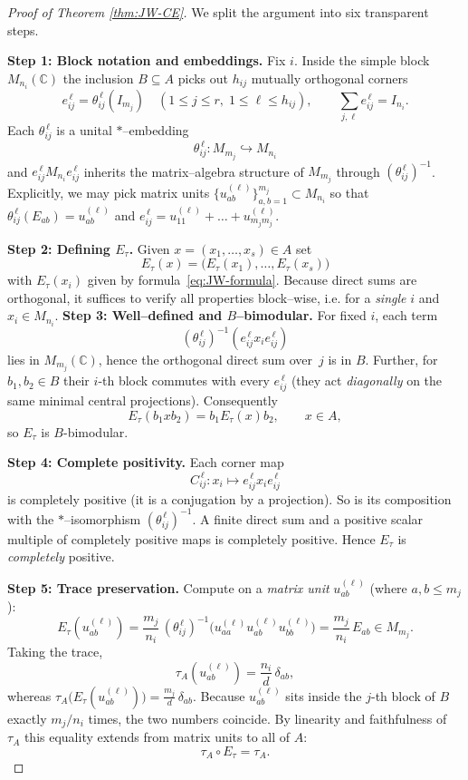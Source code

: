 \documentclass[11pt]{article}
\theoremstyle{mytheoremstyle}
\theoremstyle{definition}
\theoremstyle{remark}
\begin{document}
\begin{proof}[Proof of Theorem \ref{thm:JW-CE}]
We split the argument into six transparent steps.

\medskip
\noindent\textbf{Step 1: Block notation and embeddings.} Fix $i$.
Inside the simple block $M_{n_i}(\mathbb{C})$ the inclusion
$B\subseteq A$ picks out
$h_{ij}$ mutually orthogonal corners
\[
   e_{ij}^{\,\ell}= \theta_{ij}^{\,\ell}(I_{m_j}) 
   \quad
   (1\le j\le r,\;1\le \ell\le h_{ij}),
   \qquad
   \sum_{j,\ell}e_{ij}^{\,\ell}=I_{n_i}.
\]
Each $\theta_{ij}^{\,\ell}$ is a unital $\ast$–embedding
\[
\theta_{ij}^{\,\ell}:M_{m_j}\hookrightarrow M_{n_i}
\]
and \(e_{ij}^{\,\ell}M_{n_i}e_{ij}^{\,\ell}\)
inherits the matrix–algebra structure of $M_{m_j}$ through
\((\theta_{ij}^{\,\ell})^{-1}\). 
Explicitly, we may pick matrix units \(\{u^{(\ell)}_{ab}\}_{a,b=1}^{m_j}\subset M_{n_i}\)
so that
$\theta_{ij}^{\,\ell}(E_{ab})=u_{ab}^{(\ell)}$
and
$e_{ij}^{\,\ell}=u^{(\ell)}_{11}+\dots+u^{(\ell)}_{m_jm_j}$.

\medskip
\noindent\textbf{Step 2: Defining $E_\tau$.} Given $x=(x_1,\dots,x_s)\in A$ set
\[
E_\tau(x)=\bigl( E_\tau(x_1),\dots,E_\tau(x_s)\bigr)
\]
with $E_\tau(x_i)$ given by formula~\eqref{eq:JW-formula}.
Because direct sums are orthogonal, it suffices to verify all properties
block–wise, i.e. for a \emph{single} $i$ and $x_i\in M_{n_i}$.
\medskip
\noindent\textbf{Step 3: Well–defined and $B$–bimodular.} For fixed $i$, each term
\[
  (\theta_{ij}^{\,\ell})^{-1}(e_{ij}^{\,\ell}x_ie_{ij}^{\,\ell})
\]
lies in $M_{m_j}(\mathbb{C})$,
hence the orthogonal direct sum
over~$j$ is in $B$.
Further, for $b_1,b_2\in B$ their $i$-th block
commutes with every $e_{ij}^{\,\ell}$ (they act \emph{diagonally} on the same
minimal central projections).  Consequently
\[
   E_\tau(b_1x b_2)=b_1E_\tau(x)b_2,
   \qquad
   x\in A,
\]
so $E_\tau$ is $B$-bimodular.

\medskip
\noindent\textbf{Step 4: Complete positivity.} Each corner map
\[
   C_{ij}^{\,\ell}:x_i\mapsto e_{ij}^{\,\ell}x_ie_{ij}^{\,\ell}
\]
is completely positive (it is a conjugation by a projection).
So is its composition with the $*$–isomorphism
\((\theta_{ij}^{\,\ell})^{-1}\). 
A finite direct sum and a positive scalar multiple of completely positive
maps is completely positive.
Hence $E_\tau$ is \emph{completely} positive.

\medskip
\noindent\textbf{Step 5: Trace preservation.} Compute on a \emph{matrix unit} $u_{ab}^{(\ell)}$ (where $a,b\le m_j$):
\[
   E_\tau(u_{ab}^{(\ell)}) = \frac{m_j}{n_i}\, 
     (\theta_{ij}^{\,\ell})^{-1}
     \!\bigl(u_{aa}^{(\ell)}u_{ab}^{(\ell)}u_{bb}^{(\ell)}\bigr)
   =\frac{m_j}{n_i}\,E_{ab}\in M_{m_j}.
\]
Taking the trace,
\[
\tau_A(u_{ab}^{(\ell)}) = \frac{n_i}{d}\,\delta_{ab},
\]
whereas
\( \tau_A\!\bigl(E_\tau(u_{ab}^{(\ell)})\bigr) = \frac{m_j}{d}\,\delta_{ab}.\)
Because $u^{(\ell)}_{ab}$ sits inside the $j$-th block of $B$ exactly
\(m_j/n_i\) times, the two numbers coincide.
By linearity and faithfulness of $\tau_A$
this equality extends from matrix units to all of $A$:
\[
   \tau_A\circ E_\tau=\tau_A.
\]


\end{proof}
\end{document}

